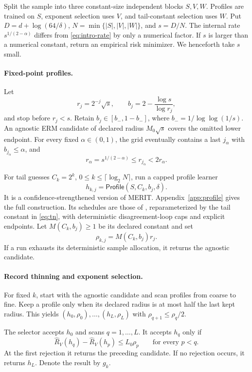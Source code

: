 \documentclass[twoside]{article}
\newcommand{\Profile}{\mathsf{Profile}}
\begin{document}
Split the sample into three constant-size independent blocks $S,V,W$. Profiles are trained on $S$, exponent selection uses $V$, and tail-constant selection uses $W$. Put $D=d+\log(64/\delta)$, $N=\min\{|S|,|V|,|W|\}$, and $s=D/N$. The internal rate $s^{1/(2-\alpha)}$ differs from \eqref{eq:intro-rate} by only a numerical factor. If $s$ is larger than a numerical constant, return an empirical risk minimizer. We henceforth take $s$ small.

\paragraph{Fixed-point profiles.}
Let \[ r_j=2^{-j}\sqrt{s},\qquad b_j=2-\frac{\log s}{\log r_j},
 \label{eq:grid}
\] and stop before $r_j<s$. Retain $b_j\in[b_-,1-b_-]$, where $b_-=1/\log\log(1/s)$. An agnostic ERM candidate of declared radius $M_0\sqrt{s}$ covers the omitted lower endpoint. For every fixed $\alpha\in(0,1)$, the grid eventually contains a last $j_\alpha$ with $b_{j_\alpha}\leq\alpha$, and
\begin{equation}
 r_\alpha=s^{1/(2-\alpha)}\leq r_{j_\alpha}<2r_\alpha.
 \label{eq:oracle-grid}
\end{equation}

For tail guesses $C_k=2^k$, $0\leq k\leq\lceil\log_2N\rceil$, run a capped profile learner \[ h_{k,j}=\Profile(S,C_k,b_j,\delta). \] It is a confidence-strengthened version of MERIT. Appendix~\ref{app:profile} gives the full construction. Its schedules are those of \citet{hanneke2026optimal}, reparameterized by the tail constant in \eqref{eq:tn}, with deterministic disagreement-loop caps and explicit endpoints. Let $M(C_k,b_j)\geq1$ be its declared constant and set \[ \rho_{k,j}=M(C_k,b_j)r_j. \] If a run exhausts its deterministic sample allocation, it returns the agnostic candidate.

\paragraph{Record thinning and exponent selection.}
For fixed $k$, start with the agnostic candidate and scan profiles from coarse to fine. Keep a profile only when its declared radius is at most half the last kept radius. This yields $(h_0,\rho_0),\ldots,(h_L,\rho_L)$ with $\rho_{q+1}\leq\rho_q/2$.

The selector accepts $h_0$ and scans $q=1,\ldots,L$. It accepts $h_q$ only if
\begin{equation}
 \widehat R_V(h_q)-\widehat R_V(h_p)
 \leq L_0\rho_p\qquad\text{for every }p<q.
 \label{eq:selector}
\end{equation}
At the first rejection it returns the preceding candidate. If no rejection occurs, it returns $h_L$. Denote the result by $g_k$.
\end{document}
